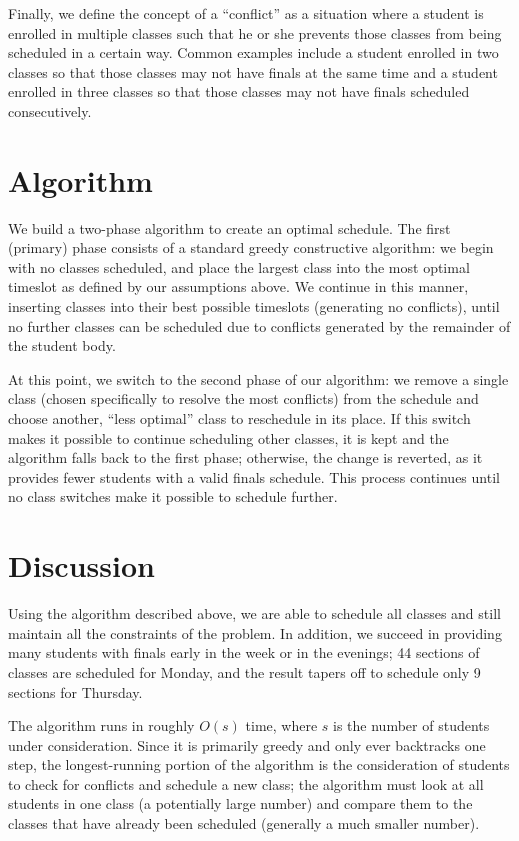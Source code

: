 \documentclass{article}
\begin{document}
Finally, we define the concept of a ``conflict'' as a situation where a student is enrolled in multiple classes such that he or she prevents those classes from being scheduled in a certain way. Common examples include a student enrolled in two classes so that those classes may not have finals at the same time and a student enrolled in three classes so that those classes may not have finals scheduled consecutively.

\section{Algorithm}

We build a two-phase algorithm to create an optimal schedule. The first (primary) phase consists of a standard greedy constructive algorithm: we begin with no classes scheduled, and place the largest class into the most optimal timeslot as defined by our assumptions above. We continue in this manner, inserting classes into their best possible timeslots (generating no conflicts), until no further classes can be scheduled due to conflicts generated by the remainder of the student body.

At this point, we switch to the second phase of our algorithm: we remove a single class (chosen specifically to resolve the most conflicts) from the schedule and choose another, ``less optimal'' class to reschedule in its place. If this switch makes it possible to continue scheduling other classes, it is kept and the algorithm falls back to the first phase; otherwise, the change is reverted, as it provides fewer students with a valid finals schedule. This process continues until no class switches make it possible to schedule further.

\section{Discussion}

Using the algorithm described above, we are able to schedule all classes and still maintain all the constraints of the problem. In addition, we succeed in providing many students with finals early in the week or in the evenings; 44 sections of classes are scheduled for Monday, and the result tapers off to schedule only 9 sections for Thursday.

The algorithm runs in roughly $O(s)$ time, where $s$ is the number of students under consideration. Since it is primarily greedy and only ever backtracks one step, the longest-running portion of the algorithm is the consideration of students to check for conflicts and schedule a new class; the algorithm must look at all students in one class (a potentially large number) and compare them to the classes that have already been scheduled (generally a much smaller number).
\end{document}

